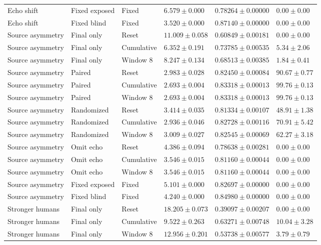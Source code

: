 \begin{longtable}{@{}llllll@{}}
Echo shift & Fixed exposed & Fixed & $6.579 \pm 0.000$ & $0.78264 \pm 0.00000$ & $0.00 \pm 0.00$ \\
Echo shift & Fixed blind & Fixed & $3.520 \pm 0.000$ & $0.87140 \pm 0.00000$ & $0.00 \pm 0.00$ \\
Source asymmetry & Final only & Reset & $11.009 \pm 0.058$ & $0.60849 \pm 0.00181$ & $0.00 \pm 0.00$ \\
Source asymmetry & Final only & Cumulative & $6.352 \pm 0.191$ & $0.73785 \pm 0.00535$ & $5.34 \pm 2.06$ \\
Source asymmetry & Final only & Window 8 & $8.247 \pm 0.134$ & $0.68513 \pm 0.00385$ & $1.84 \pm 0.41$ \\
Source asymmetry & Paired & Reset & $2.983 \pm 0.028$ & $0.82450 \pm 0.00084$ & $90.67 \pm 0.77$ \\
Source asymmetry & Paired & Cumulative & $2.693 \pm 0.004$ & $0.83318 \pm 0.00013$ & $99.76 \pm 0.13$ \\
Source asymmetry & Paired & Window 8 & $2.693 \pm 0.004$ & $0.83318 \pm 0.00013$ & $99.76 \pm 0.13$ \\
Source asymmetry & Randomized & Reset & $3.414 \pm 0.035$ & $0.81334 \pm 0.00107$ & $48.91 \pm 1.38$ \\
Source asymmetry & Randomized & Cumulative & $2.936 \pm 0.046$ & $0.82728 \pm 0.00116$ & $70.91 \pm 5.42$ \\
Source asymmetry & Randomized & Window 8 & $3.009 \pm 0.027$ & $0.82545 \pm 0.00069$ & $62.27 \pm 3.18$ \\
Source asymmetry & Omit echo & Reset & $4.386 \pm 0.094$ & $0.78638 \pm 0.00281$ & $0.00 \pm 0.00$ \\
Source asymmetry & Omit echo & Cumulative & $3.546 \pm 0.015$ & $0.81160 \pm 0.00044$ & $0.00 \pm 0.00$ \\
Source asymmetry & Omit echo & Window 8 & $3.546 \pm 0.015$ & $0.81160 \pm 0.00044$ & $0.00 \pm 0.00$ \\
Source asymmetry & Fixed exposed & Fixed & $5.101 \pm 0.000$ & $0.82697 \pm 0.00000$ & $0.00 \pm 0.00$ \\
Source asymmetry & Fixed blind & Fixed & $4.240 \pm 0.000$ & $0.84980 \pm 0.00000$ & $0.00 \pm 0.00$ \\
Stronger humans & Final only & Reset & $18.205 \pm 0.073$ & $0.39097 \pm 0.00207$ & $0.00 \pm 0.00$ \\
Stronger humans & Final only & Cumulative & $9.522 \pm 0.263$ & $0.63271 \pm 0.00748$ & $10.04 \pm 3.28$ \\
Stronger humans & Final only & Window 8 & $12.956 \pm 0.201$ & $0.53738 \pm 0.00577$ & $3.79 \pm 0.79$ \\

\end{longtable}
